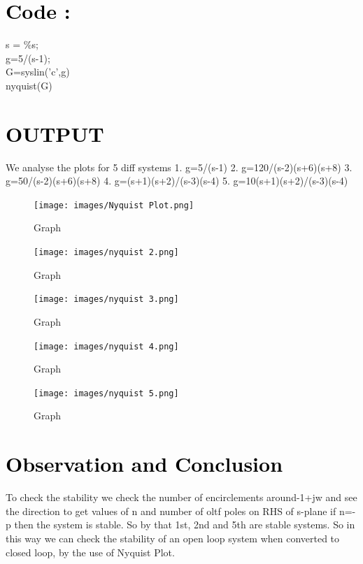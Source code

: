 \documentclass[12pt]{article}
\begin{document}
 \par

\section*{\textcolor{black}{Code :}}

s = \%s;\\
g=5/(s-1);\\
G=syslin('c',g)\\
nyquist(G)\\


  \par 

\section*{\textcolor{black}{OUTPUT}}
We analyse the plots for 5 diff systems
1. g=5/(s-1)
2. g=120/(s-2)(s+6)(s+8)
3. g=50/(s-2)(s+6)(s+8)
4. g=(s+1)(s+2)/(s-3)(s-4)
5. g=10(s+1)(s+2)/(s-3)(s-4)

\begin{figure}[!hth]
        \centering
        \texttt{[image: images/Nyquist Plot.png]}
        \caption{Graph}
        \label{Graph}
\end{figure}
\begin{figure}[!hth]
        \centering
        \texttt{[image: images/nyquist 2.png]}
        \caption{Graph}
        \label{Graph}
\end{figure}
\begin{figure}[!hth]
        \centering
        \texttt{[image: images/nyquist 3.png]}
        \caption{Graph}
        \label{Graph}
\end{figure}
\begin{figure}[!hth]
        \centering
        \texttt{[image: images/nyquist 4.png]}
        \caption{Graph}
        \label{Graph}
\end{figure}
\begin{figure}[!hth]
        \centering
        \texttt{[image: images/nyquist 5.png]}
        \caption{Graph}
        \label{Graph}
\end{figure}

\section*{\textcolor{black}{Observation and Conclusion}}
To check the stability we check the number of encirclements around-1+jw and see the direction to get values of n and number of oltf poles on RHS of s-plane if n=-p then the system is stable.
So by that 1st, 2nd and 5th are stable systems.
So in this way we can check the stability of an open loop system when converted to closed loop, by the use of Nyquist Plot.
\pagebreak
\end{document}
